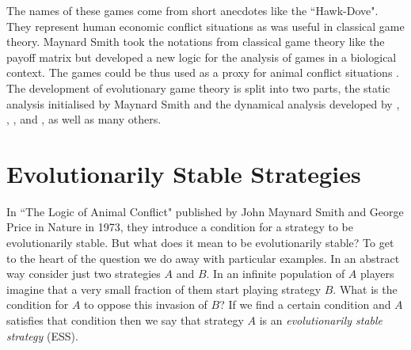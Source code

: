 \documentclass[oneside,11pt,a4paper]{book}
\begin{document}
The names of these games come from short anecdotes like the ``Hawk-Dove".
They represent human economic conflict situations as was useful in classical game theory.
Maynard Smith took the notations from classical game theory \citep{neumann:1944ef} like the payoff matrix but developed a new logic for the analysis of games in a biological context.
The games could be thus used as a proxy for animal conflict situations \citep{maynard-smith:1973to}.
The development of evolutionary game theory is split into two parts, the static analysis initialised by Maynard Smith and the dynamical analysis  developed by \citet{taylor:1978wv}, \citet{zeeman:1980ze}, \citet{schuster:1983le}, \citet{hofbauer:1985jm} and \citet{hofbauer:1988mm}, as well as many others.

\section{Evolutionarily Stable Strategies}
\label{sec:ess}
In ``The Logic of Animal Conflict" published by John Maynard Smith and George Price in Nature in 1973, they introduce a condition for a strategy to be evolutionarily stable.
But what does it mean to be evolutionarily stable?
To get to the heart of the question we do away with particular examples.
In an abstract way consider just two strategies $A$ and $B$.
In an infinite population of $A$ players imagine that a very small fraction of them start playing strategy $B$.
What is the condition for $A$ to oppose this invasion of $B$?
If we find a certain condition and $A$ satisfies that condition then we say that strategy $A$ is an \textit{evolutionarily stable strategy} (ESS).
\end{document}

